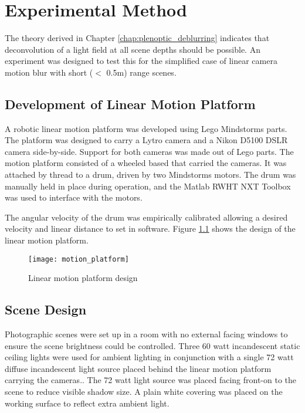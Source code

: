 
\chapter{Experimental Method}
\label{chap:experimental_method}

The theory derived in Chapter \ref{chap:plenoptic_deblurring} indicates that deconvolution of a light field at all scene depths should be possible. 
An experiment was designed to test this for the simplified case of linear camera motion blur with short ($<$ 0.5m) range scenes.

\section{Development of Linear Motion Platform}
\label{sec:development_of_linear_motion_platform}

A robotic linear motion platform was developed using Lego\textsuperscript{\textregistered} Mindstorms\textsuperscript{\textregistered} parts.
The platform was designed to carry a Lytro camera and a Nikon D5100 DSLR camera side-by-side.
Support for both cameras was made out of Lego parts.
The motion platform consisted of a wheeled based that carried the cameras.
It was attached by thread to a drum, driven by two Mindstorms motors.
The drum was manually held in place during operation, and the Matlab RWHT NXT Toolbox \cite{rwth2007toolbox} was used to interface with the motors.

The angular velocity of the drum was empirically calibrated allowing a desired velocity and linear distance to set in software.
Figure \ref{fig:motion_platform} shows the design of the linear motion platform.

\begin{figure}[h]
\centering
\texttt{[image: motion\_platform]}
\caption[Linear motion platform design]{Linear motion platform design}
\label{fig:motion_platform}
\end{figure}


\section{Scene Design}
\label{sec:scene_design}

Photographic scenes were set up in a room with no external facing windows to ensure the scene brightness could be controlled.
Three 60 watt incandescent static ceiling lights were used for ambient lighting in conjunction with a single 72 watt diffuse incandescent light source placed behind the linear motion platform carrying the cameras..
The 72 watt light source was placed facing front-on to the scene to reduce visible shadow size.
A plain white covering was placed on the working surface to reflect extra ambient light.


